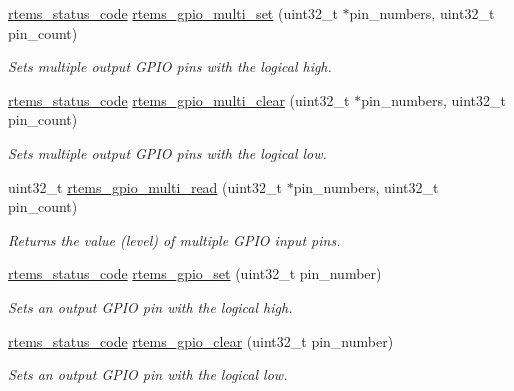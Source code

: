 \begin{DoxyCompactItemize}
\mbox{\hyperlink{group__ClassicStatus_ga545d41846817eaba6143d52ee4d9e9fe}{rtems\+\_\+status\+\_\+code}} \mbox{\hyperlink{gpio-support_8c_a462e6597484ac8edac564ca08c799cce}{rtems\+\_\+gpio\+\_\+multi\+\_\+set}} (uint32\+\_\+t $\ast$pin\+\_\+numbers, uint32\+\_\+t pin\+\_\+count)
\begin{DoxyCompactList}\small\item\em Sets multiple output G\+P\+IO pins with the logical high. \end{DoxyCompactList}\item 
\mbox{\hyperlink{group__ClassicStatus_ga545d41846817eaba6143d52ee4d9e9fe}{rtems\+\_\+status\+\_\+code}} \mbox{\hyperlink{gpio-support_8c_afe29be9002176e368122afde0bc92141}{rtems\+\_\+gpio\+\_\+multi\+\_\+clear}} (uint32\+\_\+t $\ast$pin\+\_\+numbers, uint32\+\_\+t pin\+\_\+count)
\begin{DoxyCompactList}\small\item\em Sets multiple output G\+P\+IO pins with the logical low. \end{DoxyCompactList}\item 
uint32\+\_\+t \mbox{\hyperlink{gpio-support_8c_ac23d24237cf539a29dd60a104acce7fa}{rtems\+\_\+gpio\+\_\+multi\+\_\+read}} (uint32\+\_\+t $\ast$pin\+\_\+numbers, uint32\+\_\+t pin\+\_\+count)
\begin{DoxyCompactList}\small\item\em Returns the value (level) of multiple G\+P\+IO input pins. \end{DoxyCompactList}\item 
\mbox{\hyperlink{group__ClassicStatus_ga545d41846817eaba6143d52ee4d9e9fe}{rtems\+\_\+status\+\_\+code}} \mbox{\hyperlink{gpio-support_8c_afa865af13489bec5abf91c7da92a79e7}{rtems\+\_\+gpio\+\_\+set}} (uint32\+\_\+t pin\+\_\+number)
\begin{DoxyCompactList}\small\item\em Sets an output G\+P\+IO pin with the logical high. \end{DoxyCompactList}\item 
\mbox{\hyperlink{group__ClassicStatus_ga545d41846817eaba6143d52ee4d9e9fe}{rtems\+\_\+status\+\_\+code}} \mbox{\hyperlink{gpio-support_8c_ac3970793265cc031c20727e26f9eed48}{rtems\+\_\+gpio\+\_\+clear}} (uint32\+\_\+t pin\+\_\+number)
\begin{DoxyCompactList}\small\item\em Sets an output G\+P\+IO pin with the logical low. \end{DoxyCompactList}\item 

\end{DoxyCompactItemize}
